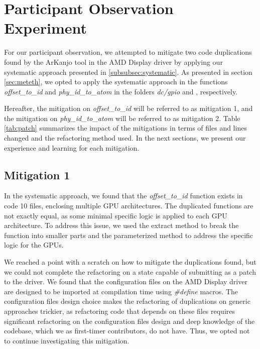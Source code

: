 \en

\section{Participant Observation Experiment}

For our participant observation, we attempted to mitigate two code 
duplications found by the ArKanjo tool in the AMD Display driver by applying 
our systematic approach presented in \ref{subsubsec:systematic}. 
As presented in section \ref{sec:meteth},
we opted to apply the systematic approach in the functions
\textit{offset\_to\_id} and \textit{phy\_id\_to\_atom} in the folders 
\textit{dc/gpio} and , respectively.

Hereafter, the mitigation on \textit{offset\_to\_id} will be referred to as mitigation 1, and the mitigation on 
\textit{phy\_id\_to\_atom} will be referred to as mitigation 2. 
Table \ref{tab:patch} summarizes the impact of the mitigations in terms of 
files and lines changed and the refactoring method used. In the next sections, 
we present our experience and learning for each mitigation.



\subsection{Mitigation 1}

In the systematic approach, we found that the \textit{offset\_to\_id} function 
exists in code 10 files, enclosing multiple GPU architectures. The duplicated 
functions are not exactly equal, as some minimal specific logic is applied to 
each GPU architecture. To address this issue, we used the extract method to 
break the function into smaller parts and the parameterized method to address 
the specific logic for the GPUs.

We reached a point with a scratch on how to mitigate the duplications found, 
but we could not complete the refactoring on a state capable of submitting as 
a patch to the driver. We found that the configuration files on the AMD Display 
driver are designed to be imported at compilation time using \textit{\#define} macros. 
The configuration files design choice makes the refactoring of duplications on 
generic approaches trickier, as refactoring code that depends on these files 
requires significant refactoring on the configuration files design and deep 
knowledge of the codebase, which we as first-timer contributors, do not have. 
Thus, we opted not to continue investigating this mitigation.

